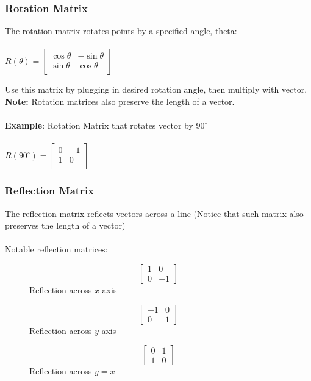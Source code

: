 \documentclass{beamer}
\begin{document}
\begin{frame}[t]\vspace{10pt}
\frametitle{Rotation Matrix}
The rotation matrix rotates points by a specified angle, theta: \\~\\
$R(\theta) = \begin{bmatrix}
\cos{\theta} & -\sin{\theta} \\
\sin{\theta} & \cos{\theta} \\
\end{bmatrix}$

Use this matrix by plugging in desired rotation angle, then multiply with vector. \\
\textbf{Note: } Rotation matrices also preserve the length of a vector. \\~\\
\textbf{Example}: Rotation Matrix that rotates vector by $90^{\circ}$ \\~\\
$R(90^{\circ}) = \begin{bmatrix}
0 & -1 \\
1 & 0 \\
\end{bmatrix}$
\end{frame}

\begin{frame}[t]\vspace{10pt}
\frametitle{Reflection Matrix}

The reflection matrix reflects vectors across a line (Notice that such matrix also preserves the length of a vector)\\~\\
Notable reflection matrices:

\begin{figure}
  \begin{minipage}{.5\linewidth}
    \centering
    \[\left[\begin{array}{cc}
      1 &  0\\
      0 & -1
    \end{array}\right]\]
    Reflection across $x$-axis
  \end{minipage}%
  \begin{minipage}{.5\linewidth}
    \centering
    \[\left[\begin{array}{cc}
      -1 &  0\\
      0 & 1
    \end{array}\right]\]
    Reflection across $y$-axis
  \end{minipage}
  \begin{minipage}{.5\linewidth}
    \centering
    \[\left[\begin{array}{cc}
      0 & 1\\
      1 & 0
    \end{array}\right]\]
    Reflection across $y=x$
  \end{minipage}
\end{figure}
\end{frame}
\end{document}
